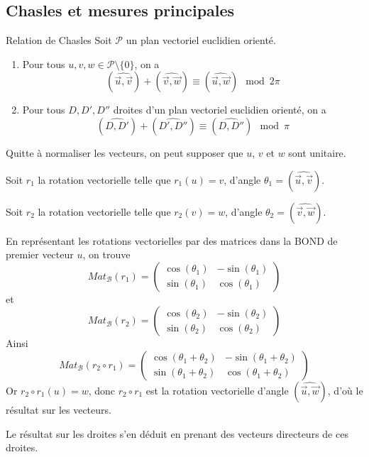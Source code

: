 \documentclass[a4paper,12pt]{article}
\begin{document}
\subsection{Chasles et mesures principales}

\begin{theoreme}{Relation de Chasles}{}
    Soit $\mathcal{P}$ un plan vectoriel euclidien orienté.
    \begin{enumerate}
        \item Pour tous $u, v, w \in \mathcal{P}\setminus\{0\}$, on a
        $$
        (\widehat{\overrightarrow{u}, \overrightarrow{v}}) + (\widehat{\overrightarrow{v}, \overrightarrow{w}}) \equiv (\widehat{\overrightarrow{u}, \overrightarrow{w}}) \mod 2\pi
        $$
        \item Pour tous $D, D', D''$ droites d'un plan vectoriel euclidien orienté, on a
        $$
        (\widehat{D, D'}) + (\widehat{D', D''}) \equiv (\widehat{D, D''}) \mod \pi
        $$
    \end{enumerate}
\end{theoreme}

\begin{demonstration}
    Quitte à normaliser les vecteurs, on peut supposer que $u$, $v$ et $w$ sont unitaire.

    Soit $r_1$ la rotation vectorielle telle que $r_1(u) = v$, d'angle $\theta_1 = (\widehat{\overrightarrow{u}, \overrightarrow{v}})$.
    
    Soit $r_2$ la rotation vectorielle telle que $r_2(v) = w$, d'angle $\theta_2 = (\widehat{\overrightarrow{v}, \overrightarrow{w}})$.

    En représentant les rotations vectorielles par des matrices dans la BOND de premier vecteur $u$, on trouve
    $$
    Mat_{\mathcal{B}}(r_1) = \begin{pmatrix}
        \cos(\theta_1) & -\sin(\theta_1) \\
        \sin(\theta_1) & \cos(\theta_1)
    \end{pmatrix}
    $$
    et
    $$
    Mat_{\mathcal{B}}(r_2) = \begin{pmatrix}
        \cos(\theta_2) & -\sin(\theta_2) \\
        \sin(\theta_2) & \cos(\theta_2)
    \end{pmatrix}
    $$
    Ainsi
    $$
    Mat_{\mathcal{B}}(r_2 \circ r_1) = \begin{pmatrix}
        \cos(\theta_1 + \theta_2) & -\sin(\theta_1 + \theta_2) \\
        \sin(\theta_1 + \theta_2) & \cos(\theta_1 + \theta_2)
    \end{pmatrix}
    $$
    Or $r_2 \circ r_1(u) = w$, donc $r_2 \circ r_1$ est la rotation vectorielle d'angle $(\widehat{\overrightarrow{u}, \overrightarrow{w}})$, d'où le résultat sur les vecteurs.

    Le résultat sur les droites s'en déduit en prenant des vecteurs directeurs de ces droites.
\end{demonstration}
\end{document}
